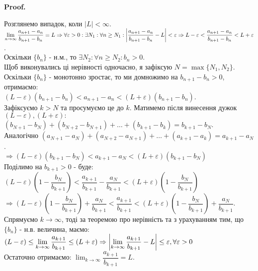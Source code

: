 \documentclass[a4paper, 14pt]{article}
\makeatletter
\def\qed{$\blacksquare$}
\theoremstyle{theoremdd}
\theoremstyle{theoremdd}
\theoremstyle{theoremdd}
\theoremstyle{theoremdd}
\theoremstyle{theoremdd}
\theoremstyle{theoremdd}
\theoremstyle{theoremdd}
\theoremstyle{theoremdd}
\renewenvironment{proof}[1][Proof.\\]{\par
\pushQED{\hfill \qed}%
\normalfont \topsep6\p@\@plus6\p@\relax
\trivlist
\item\relax
{\bfseries
#1\@addpunct{.}}\hspace\labelsep\ignorespaces
}{%
\popQED\endtrivlist\@endpefalse
}
\makeatother
\begin{document}
	\begin{proof}
	Розглянемо випадок, коли $|L| < \infty$.\\
	$\displaystyle \lim_{n \to \infty} \dfrac{a_{n+1} - a_n}{b_{n+1} - b_n} = L \Rightarrow \forall \varepsilon > 0: \exists N_1: \forall n \geq N_1: \abs{\dfrac{a_{n+1}-a_n}{b_{n+1}-b_n} - L} < \varepsilon \Rightarrow L - \varepsilon < \dfrac{a_{n+1} - a_n}{b_{n+1} - b_n} < L + \varepsilon$.\\
	Оскільки $\{b_n\}$ - н.м., то $\exists N_2: \forall n \geq N_2: b_n > 0$.\\
	Щоб виконувались ці нерівності одночасно, я зафіксую $N = \max \{N_1, N_2\}$.\\
	Оскільки $\{b_n\}$ - монотонно зростає, то ми домножимо на $b_{n+1} - b_n > 0$, отримаємо:\\
	$(L - \varepsilon)(b_{n+1} - b_n) < a_{n+1} - a_n < (L + \varepsilon)(b_{n+1} - b_n)$.\\
	Зафіксуємо $k > N$ та просумуємо це до $k$. Матимемо після винесення дужок $(L-\varepsilon), (L+\varepsilon):$ \\
	$(b_{N+1} - b_N) + (b_{N+2} - b_{N+1}) + \dots + (b_{k+1} - b_{k}) = b_{k+1} - b_N$.\\
	Аналогічно $(a_{N+1} - a_N) + (a_{N+2} - a_{N+1}) + \dots + (a_{k+1} - a_{k}) = a_{k+1} - a_N$.\\
	$\Rightarrow(L - \varepsilon)(b_{k+1} - b_N) < a_{k+1} - a_N < (L + \varepsilon)(b_{k+1} - b_N)$\\
	Поділимо на $b_{k+1} > 0$ - буде:\\
	$(L - \varepsilon) \left(1 - \dfrac{b_N}{b_{k+1}} \right) < \dfrac{a_{k+1}}{b_{k+1}} - \dfrac{a_N}{b_{k+1}} < (L + \varepsilon) \left(1 - \dfrac{b_N}{b_{k+1}} \right)$\\
	$\Rightarrow (L - \varepsilon) \left(1 - \dfrac{b_N}{b_{k+1}} \right) + \dfrac{a_N}{b_{k+1}}  < \dfrac{a_{k+1}}{b_{k+1}} < (L + \varepsilon) \left(1 - \dfrac{b_N}{b_{k+1}} \right) + \dfrac{a_N}{b_{k+1}}$.\\
	Спрямуємо $k \to \infty$, тоді за теоремою про нерівність та з урахуванням тим, що $\{b_n\}$ - н.в. величина, маємо:\\
	$(L-\varepsilon) \leq \displaystyle \lim_{k \to \infty} \dfrac{a_{k+1}}{b_{k+1}} \leq (L + \varepsilon) \Rightarrow \abs{\displaystyle \lim_{k \to \infty} \dfrac{a_{k+1}}{b_{k+1}} - L} \leq \varepsilon, \forall \varepsilon > 0$\\
	Остаточно отримаємо: $\displaystyle \lim_{k \to \infty} \dfrac{a_{k+1}}{b_{k+1}} = L$.
	\bigskip \\

\end{proof}
\end{document}
